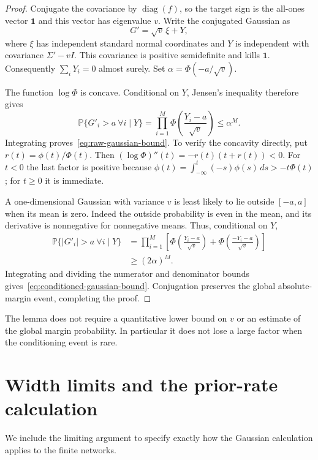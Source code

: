 \documentclass[11pt]{article}
\theoremstyle{remark}
\newcommand{\Prb}{\mathbb P}
\begin{document}
\begin{proof}
Conjugate the covariance by $\operatorname{diag}(f)$, so the target
sign is the all-ones vector $\mathbf1$ and this vector has
eigenvalue $v$. Write the conjugated Gaussian as
\[
 G'=\sqrt v\,\xi+Y,
\]
where $\xi$ has independent standard normal coordinates and $Y$
is independent with covariance $\Sigma'-vI$. This covariance is
positive semidefinite and kills $\mathbf1$. Consequently
$\sum_iY_i=0$ almost surely. Set $\alpha=\Phi(-a/\sqrt v)$.

The function $\log\Phi$ is concave. Conditional on $Y$, Jensen's
inequality therefore gives
\[
 \Prb\{G'_i>a\ \forall i\mid Y\}
 =\prod_{i=1}^M\Phi\!\left(\frac{Y_i-a}{\sqrt v}\right)
 \le \alpha^M.
\]
Integrating proves~\eqref{eq:raw-gaussian-bound}. To verify the
concavity directly, put $r(t)=\phi(t)/\Phi(t)$. Then
$(\log\Phi)''(t)=-r(t)(t+r(t))<0$. For $t<0$ the last factor is
positive because
$\phi(t)=\int_{-\infty}^t(-s)\phi(s)\,ds>-t\Phi(t)$;
for $t\ge0$ it is immediate.

A one-dimensional Gaussian with variance $v$ is least likely to
lie outside $[-a,a]$ when its mean is zero. Indeed the outside
probability is even in the mean, and its derivative is nonnegative
for nonnegative means. Thus, conditional on $Y$,
\begin{align*}
 \Prb\{|G'_i|>a\ \forall i\mid Y\}
 &=\prod_{i=1}^M\left[
   \Phi\!\left(\frac{Y_i-a}{\sqrt v}\right)
  +\Phi\!\left(\frac{-Y_i-a}{\sqrt v}\right)\right]\\
 &\ge (2\alpha)^M.
\end{align*}
Integrating and dividing the numerator and denominator bounds
gives~\eqref{eq:conditioned-gaussian-bound}. Conjugation preserves
the global absolute-margin event, completing the proof.
\end{proof}

The lemma does not require a quantitative lower bound on $v$ or
an estimate of the global margin probability. In particular it
does not lose a large factor when the conditioning event is rare.

\section{Width limits and the prior-rate calculation}

We include the limiting argument to specify exactly how the
Gaussian calculation applies to the finite networks.
\end{document}
